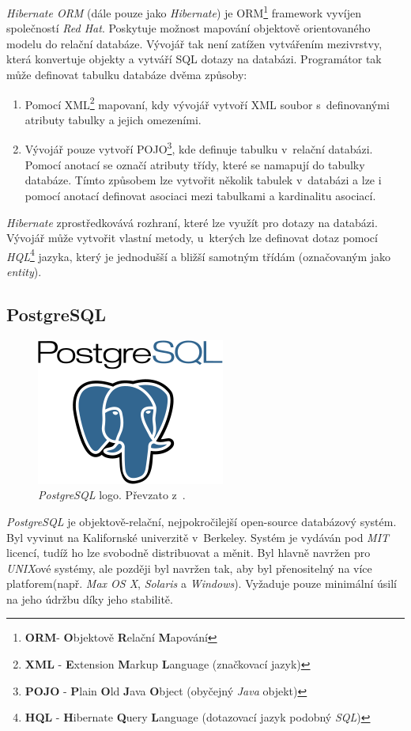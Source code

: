 \emph{Hibernate ORM} (dále pouze jako \emph{Hibernate}) je ORM\footnote{\textbf{ORM}- \textbf{O}bjektově \textbf{R}elační \textbf{M}apování} framework vyvíjen společností \emph{Red Hat}.
Poskytuje možnost mapování objektově orientovaného modelu do relační databáze.
Vývojář tak není zatížen vytvářením mezivrstvy, která konvertuje objekty a vytváří SQL dotazy na databázi.
Programátor tak může definovat tabulku databáze dvěma způsoby:
\begin{enumerate}
  \item Pomocí XML\footnote{\textbf{XML} - \textbf{E}xtension \textbf{M}arkup \textbf{L}anguage (značkovací jazyk)} mapovaní, kdy vývojář vytvoří XML soubor s~definovanými atributy tabulky a jejich omezeními.
  \item Vývojář pouze vytvoří POJO\footnote{\textbf{POJO} - \textbf{P}lain \textbf{O}ld \textbf{J}ava \textbf{O}bject (obyčejný \emph{Java} objekt)}, kde definuje tabulku v~relační databázi. Pomocí anotací se označí atributy třídy, které se namapují do tabulky databáze.
        Tímto způsobem lze vytvořit několik tabulek v~databázi a lze i pomocí anotací definovat asociaci mezi tabulkami a kardinalitu asociací.
\end{enumerate}
\emph{Hibernate} zprostředkovává rozhraní, které lze využít pro dotazy na databázi.
Vývojář může vytvořit vlastní metody, u~kterých lze definovat dotaz pomocí \emph{HQL}\footnote{\textbf{HQL} - \textbf{H}ibernate \textbf{Q}uery \textbf{L}anguage (dotazovací jazyk podobný \emph{SQL})} jazyka,
který je jednodušší a bližší samotným třídám (označovaným jako \emph{entity}).

\subsection*{PostgreSQL}
\label{pouzite:postgresql}
\begin{figure}[hbt]
  \centering
  \includegraphics[width=.2 \linewidth]{obrazky-figures/post.png}
  \caption{\emph{PostgreSQL} logo. Převzato z~\cite{postgres:tutorial}.}
\end{figure}

\emph{PostgreSQL} je objektově-relační, nejpokročilejší open-source databázový systém.
Byl vyvinut na Kalifornské univerzitě v~Berkeley.
Systém je vydáván pod \emph{MIT} licencí, tudíž ho lze svobodně distribuovat a měnit.
Byl hlavně navržen pro \emph{UNIX}ové systémy, ale později byl navržen tak, aby byl přenositelný na více platforem(např. \emph{Max OS X}, \emph{Solaris} a \emph{Windows}).
Vyžaduje pouze minimální úsilí na jeho údržbu díky jeho stabilitě.~\cite{postgres:tutorial}

